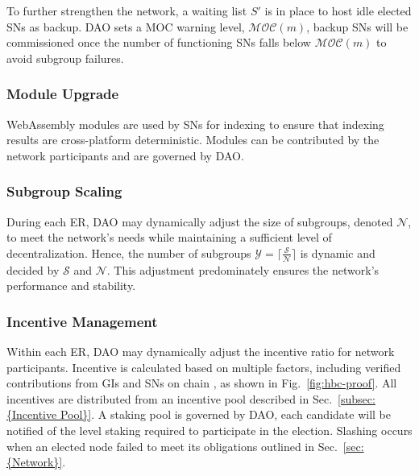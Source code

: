 To further strengthen the network, a waiting list ${S'}$ is in place to host idle elected SNs as backup. DAO sets a MOC warning level, $\mathcal{MOC}(m)$, backup SNs will be commissioned once the number of functioning SNs falls below $\mathcal{MOC}(m)$ to avoid subgroup failures.

\subsubsection{Module Upgrade}

WebAssembly modules are used by SNs for indexing to ensure that indexing results are cross-platform deterministic. Modules can be contributed by the network participants and are governed by DAO.

\subsubsection{Subgroup Scaling}

During each ER, DAO may dynamically adjust the size of subgroups, denoted $\mathcal{N}$, to meet the network's needs while maintaining a sufficient level of decentralization. Hence, the number of subgroups $\mathcal{Y}=\lceil\frac{\mathcal{S}}{\mathcal{N}}\rceil$ is dynamic and decided by $\mathcal{S}$ and $\mathcal{N}$. This adjustment predominately ensures the network's performance and stability.

\subsubsection{Incentive Management}

Within each ER, DAO may dynamically adjust the incentive ratio for network participants. Incentive is calculated based on multiple factors, including verified contributions from GIs and SNs on chain , as shown in Fig.~\ref{fig:hbc-proof}. All incentives are distributed from an incentive pool described in Sec.~\ref{subsec:{Incentive Pool}}. A staking pool is governed by DAO, each candidate will be notified of the level staking required to participate in the election. Slashing occurs when an elected node failed to meet its obligations outlined in Sec.~\ref{sec:{Network}}.

